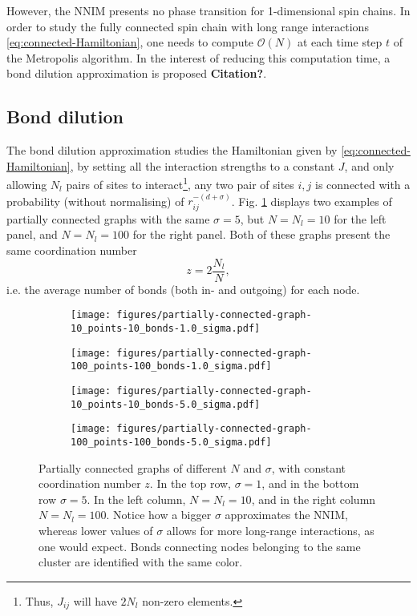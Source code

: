However, the NNIM presents no phase transition \cite{ising1925beitrag} for 1-dimensional spin chains. In order to study the fully connected spin chain with long range interactions \eqref{eq:connected-Hamiltonian}, one needs to compute $\mathcal{O}(N)$ at each time step $t$ of the Metropolis algorithm. In the interest of reducing this computation time, a bond dilution approximation is proposed \textbf{Citation?}.

\subsection{Bond dilution}%
\label{sub:Bond dilution}

The bond dilution approximation studies the Hamiltonian given by \eqref{eq:connected-Hamiltonian}, by setting all the interaction strengths to a constant $J$, and only allowing $N_l$ pairs of sites to interact\footnote{Thus, $J_{ij}$ will have $2N_l$ non-zero elements.}, any two pair of sites ${ i, j } $ is connected with a probability (without normalising) of $r_{ij}^{-(d+\sigma)}$. Fig. \ref{fig:a-partially-connected-graph} displays two examples of partially connected graphs with the same $\sigma= 5$, but $N=N_l=10$ for the left panel, and  $N = N_l = 100$ for the  right panel. Both of these graphs present the same coordination number $$z = 2 \frac{N_l}{N},$$ i.e. the average number of bonds (both in- and outgoing) for each node.

\begin{figure}[t]
	\begin{subfigure}{0.5\textwidth}
	\centering
	\texttt{[image: figures/partially-connected-graph-10\_points-10\_bonds-1.0\_sigma.pdf]}
\end{subfigure}
	\begin{subfigure}{0.5\textwidth}
	\centering
	\texttt{[image: figures/partially-connected-graph-100\_points-100\_bonds-1.0\_sigma.pdf]}
\end{subfigure}
	\begin{subfigure}{0.5\textwidth}
	\centering
	\texttt{[image: figures/partially-connected-graph-10\_points-10\_bonds-5.0\_sigma.pdf]}

\end{subfigure}
	\begin{subfigure}{0.5\textwidth}
	\centering
	\texttt{[image: figures/partially-connected-graph-100\_points-100\_bonds-5.0\_sigma.pdf]}
\end{subfigure}
	\caption{Partially connected graphs of different $N$ and $\sigma$, with constant coordination number $z.$ In the top row, $\sigma = 1$, and in the bottom row  $\sigma = 5.$ In the left column,  $N=N_l = 10$,  and in the right column $N=N_l = 100.$ Notice how a bigger $\sigma$ approximates the NNIM, whereas lower values of $\sigma$ allows for more long-range interactions, as one would expect. Bonds connecting nodes belonging to the same cluster are identified with the same color.}
	\label{fig:a-partially-connected-graph}
\end{figure}

